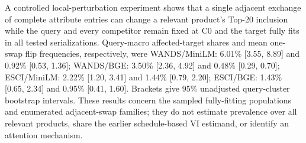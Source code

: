 A controlled local-perturbation experiment shows that a single adjacent exchange of complete attribute entries can change a relevant product's Top-20 inclusion while the query and every competitor remain fixed at C0 and the target fully fits in all tested serializations. Query-macro affected-target shares and mean one-swap flip frequencies, respectively, were WANDS/MiniLM: 6.01\% [3.55, 8.89] and 0.92\% [0.53, 1.36]; WANDS/BGE: 3.50\% [2.36, 4.92] and 0.48\% [0.29, 0.70]; ESCI/MiniLM: 2.22\% [1.20, 3.41] and 1.44\% [0.79, 2.20]; ESCI/BGE: 1.43\% [0.65, 2.34] and 0.95\% [0.41, 1.60]. Brackets give 95\% unadjusted query-cluster bootstrap intervals. These results concern the sampled fully-fitting populations and enumerated adjacent-swap families; they do not estimate prevalence over all relevant products, share the earlier schedule-based VI estimand, or identify an attention mechanism.
